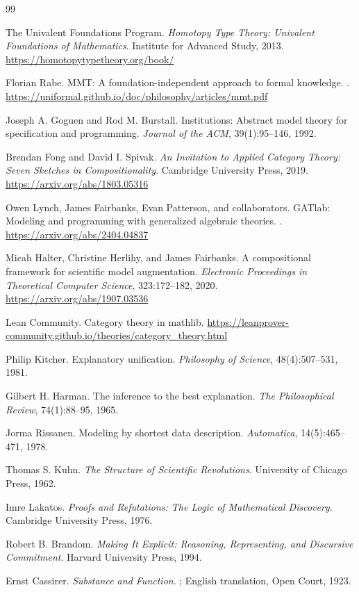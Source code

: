 \documentclass[11pt]{article}
\begin{document}
\begin{thebibliography}{99}

The Univalent Foundations Program.
\newblock \emph{Homotopy Type Theory: Univalent Foundations of Mathematics}.
\newblock Institute for Advanced Study, 2013.
\newblock \url{https://homotopytypetheory.org/book/}

Florian Rabe.
\newblock MMT: A foundation-independent approach to formal knowledge.
.
\newblock \url{https://uniformal.github.io/doc/philosophy/articles/mmt.pdf}

Joseph A. Goguen and Rod M. Burstall.
\newblock Institutions: Abstract model theory for specification and programming.
\newblock \emph{Journal of the ACM}, 39(1):95--146, 1992.

Brendan Fong and David I. Spivak.
\newblock \emph{An Invitation to Applied Category Theory: Seven Sketches in Compositionality}.
\newblock Cambridge University Press, 2019.
\newblock \url{https://arxiv.org/abs/1803.05316}

Owen Lynch, James Fairbanks, Evan Patterson, and collaborators.
\newblock GATlab: Modeling and programming with generalized algebraic theories.
.
\newblock \url{https://arxiv.org/abs/2404.04837}

Micah Halter, Christine Herlihy, and James Fairbanks.
\newblock A compositional framework for scientific model augmentation.
\newblock \emph{Electronic Proceedings in Theoretical Computer Science}, 323:172--182, 2020.
\newblock \url{https://arxiv.org/abs/1907.03536}

Lean Community.
\newblock Category theory in mathlib.
\newblock \url{https://leanprover-community.github.io/theories/category_theory.html}

Philip Kitcher.
\newblock Explanatory unification.
\newblock \emph{Philosophy of Science}, 48(4):507--531, 1981.

Gilbert H. Harman.
\newblock The inference to the best explanation.
\newblock \emph{The Philosophical Review}, 74(1):88--95, 1965.

Jorma Rissanen.
\newblock Modeling by shortest data description.
\newblock \emph{Automatica}, 14(5):465--471, 1978.

Thomas S. Kuhn.
\newblock \emph{The Structure of Scientific Revolutions}.
\newblock University of Chicago Press, 1962.

Imre Lakatos.
\newblock \emph{Proofs and Refutations: The Logic of Mathematical Discovery}.
\newblock Cambridge University Press, 1976.

Robert B. Brandom.
\newblock \emph{Making It Explicit: Reasoning, Representing, and Discursive Commitment}.
\newblock Harvard University Press, 1994.

Ernst Cassirer.
\newblock \emph{Substance and Function}.
; English translation, Open Court, 1923.

\end{thebibliography}
\end{document}
